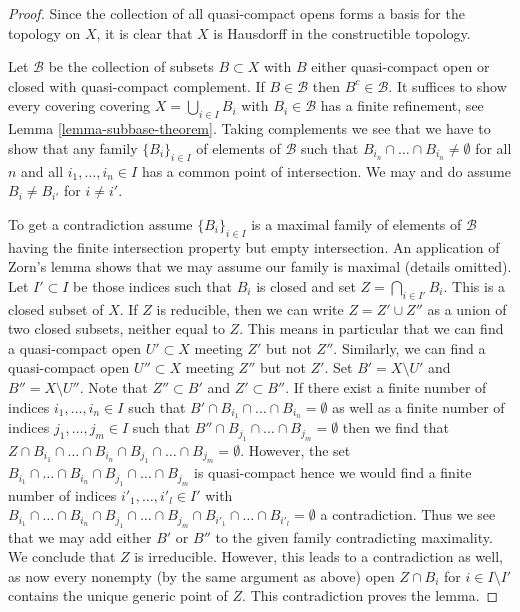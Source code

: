 \begin{proof}
Since the collection of all quasi-compact opens forms a basis for the
topology on $X$, it is clear that $X$ is Hausdorff in the constructible
topology.

\medskip\noindent
Let $\mathcal{B}$ be the collection of subsets $B \subset X$
with $B$ either quasi-compact open or closed with quasi-compact
complement. If $B \in \mathcal{B}$ then $B^c \in \mathcal{B}$.
It suffices to show every covering covering $X = \bigcup_{i \in I} B_i$
with $B_i \in \mathcal{B}$ has a finite refinement, see
Lemma \ref{lemma-subbase-theorem}.
Taking complements we see that we have to show that any family
$\{B_i\}_{i \in I}$ of elements of $\mathcal{B}$
such that $B_{i_n} \cap \ldots \cap B_{i_n} \not = \emptyset$
for all $n$ and all $i_1, \ldots, i_n \in I$
has a common point of intersection. We may and do assume
$B_i \not = B_{i'}$ for $i \not = i'$.

\medskip\noindent
To get a contradiction assume $\{B_i\}_{i \in I}$ is a maximal family
of elements of $\mathcal{B}$ having the finite intersection property
but empty intersection. An application of Zorn's lemma shows that we
may assume our family is maximal (details omitted).
Let $I' \subset I$ be those indices such that
$B_i$ is closed and set $Z = \bigcap_{i \in I'} B_i$. This is a closed
subset of $X$. If $Z$ is reducible, then we can write $Z = Z' \cup Z''$
as a union of two closed subsets, neither equal to $Z$. This means in
particular that we can find a quasi-compact open $U' \subset X$ meeting
$Z'$ but not $Z''$. Similarly, we can find a quasi-compact open
$U'' \subset X$ meeting $Z''$ but not $Z'$. Set $B' = X \setminus U'$ and
$B'' = X \setminus U''$. Note that $Z'' \subset B'$ and $Z' \subset B''$.
If there exist a finite number of indices $i_1, \ldots, i_n \in I$ such
that $B' \cap B_{i_1} \cap \ldots \cap B_{i_n} = \emptyset$
as well as a finite number of indices $j_1, \ldots, j_m \in I$ such that
$B'' \cap B_{j_1} \cap \ldots \cap B_{j_m} = \emptyset$
then we find that
$Z \cap B_{i_1} \cap \ldots \cap B_{i_n} \cap B_{j_1} \cap \ldots \cap B_{j_m}
= \emptyset$.
However, the set
$B_{i_1} \cap \ldots \cap B_{i_n} \cap B_{j_1} \cap \ldots \cap B_{j_m}$
is quasi-compact hence we would find a finite number of
indices $i'_1, \ldots, i'_l \in I'$ with
$B_{i_1} \cap \ldots \cap B_{i_n} \cap B_{j_1} \cap \ldots \cap
B_{j_m} \cap B_{i'_1} \cap \ldots \cap B_{i'_l} = \emptyset$ a contradiction.
Thus we see that we may add either $B'$ or $B''$ to the given family
contradicting maximality. We conclude that $Z$ is irreducible. However,
this leads to a contradiction as well, as now every nonempty (by the
same argument as above) open $Z \cap B_i$ for $i \in I \setminus I'$
contains the unique generic point of $Z$. This contradiction proves the lemma.
\end{proof}

